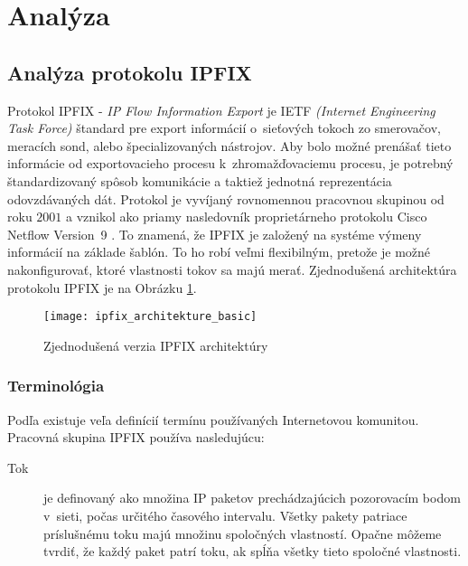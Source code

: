 \section{Anal\'yza} \label{sec:analyza}

\subsection{Anal\'yza protokolu IPFIX}

Protokol IPFIX - \emph{IP Flow Information Export} je IETF \emph{(Internet Engineering Task Force)}
štandard pre export informácií o~sieťových tokoch zo smerovačov, meracích sond, 
alebo špecializovaných nástrojov. 
Aby bolo možné prenášať tieto informácie 
od exportovacieho procesu k~zhromažďovaciemu procesu, je potrebný štandardizovaný 
spôsob komunikácie a taktiež jednotná reprezentácia odovzdávaných dát.
Protokol je vyvíjaný rovnomennou pracovnou skupinou \citep{ipfixCharter} od roku $2001$ a 
vznikol ako priamy nasledovník proprietárneho protokolu Cisco Netflow Version~9 \citep{rfc3954}. 
To znamená, že IPFIX je založený na systéme výmeny informácií na základe šablón. To ho robí veľmi
flexibilným, pretože je možné nakonfigurovať, ktoré vlastnosti tokov sa majú merať.
Zjednodušená architektúra protokolu IPFIX je na Obrázku \ref{o:ipfix_architekture_basic}. 
\citep{rfc5101, ipfixProtocol, juvhaugen, veri}

\begin{figure}[ht!]
\centering
\texttt{[image: ipfix\_architekture\_basic]}
\caption{Zjednodušená verzia IPFIX architektúry}\label{o:ipfix_architekture_basic}
\end{figure}

\subsubsection{Terminológia} \label{sec:ipfix_terminology}

Podľa \citep{rfc3917} existuje veľa definícií termínu  používaných Internetovou komunitou.
Pracovná skupina IPFIX používa nasledujúcu:
\begin{description}
  \item[Tok] je definovaný ako množina IP paketov prechádzajúcich pozorovacím bodom v~sieti, počas určitého 
časového intervalu. Všetky pakety patriace príslušnému toku majú množinu spoločných vlastností. Opačne 
môžeme tvrdiť, že každý paket patrí toku, ak spĺňa všetky tieto spoločné vlastnosti. 
\end{description}


